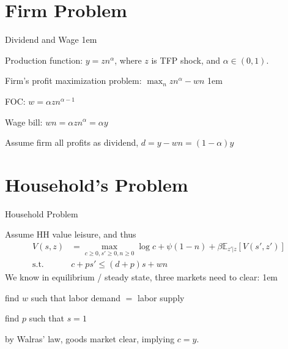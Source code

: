 \documentclass[11pt,aspectratio=43,usenames,dvipsnames]{beamer}
\let\olditemize=\itemize
\let\endolditemize=\enditemize
\renewenvironment{itemize}{\olditemize \itemsep1em}{\endolditemize}
\let\oldenumerate=\enumerate
\let\endoldenumerate=\endenumerate
\renewenvironment{enumerate}{\oldenumerate \itemsep1em}{ \endoldenumerate}
\theoremstyle{definition}
\begin{document}
\section[Firm]{Firm Problem}
\label{sec:Firm_Problem}

\begin{frame}{Dividend and Wage}
\label{slide:Dividend_and_Wage}
\begin{itemize}
    \item Production function: $ \displaystyle y = z n^{\alpha} $, where $ z $ is TFP shock, and $ \alpha \in (0, 1) $.
    \item Firm's profit maximization problem: $ \displaystyle \max_{n} z n^{\alpha} - wn $
    \begin{itemize}
        \item FOC: $ \displaystyle w = \alpha z n ^{\alpha - 1} $
    \end{itemize}
    \item Wage bill: $ \displaystyle w n = \alpha z n ^{\alpha} = \alpha y $
    \item Assume firm all profits as dividend, $ \displaystyle d = y - wn = (1-\alpha)y $
\end{itemize}

\end{frame}

\section[Household]{Household's Problem}
\label{sec:Household_s_Problem}

\begin{frame}{Household Problem}
\label{slide:Household_Problem}

Assume HH value leisure, and thus
%
\begin{align}
    V(s, z)
        & = \max_{c\ge 0, s'\ge 0, n \ge 0} \log c + \psi (1-n) + \beta \mathbb{E}_{z'|z} [V(s', z')]
    \\
    \text{s.t. } \quad
        & c + p s' \le (d + p) s + wn
\end{align}
%
We know in equilibrium / steady state, three markets need to clear:
\begin{enumerate}
    \item find $ w $ such that labor demand $ = $ labor supply
    \item find $ p $ such that $ s = 1 $
    \item by Walras' law, goods market clear, implying $ c = y $.
\end{enumerate}

\end{frame}
\end{document}
